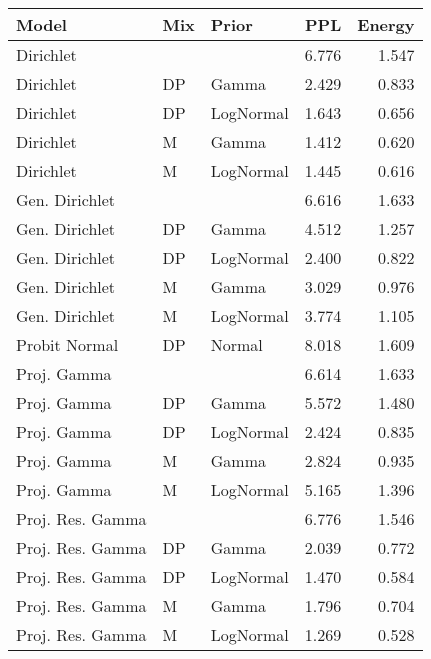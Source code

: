 \begin{table}[ht]
\centering
\begin{tabular}{lllrr}
  \hline
Model & Mix & Prior & PPL & Energy \\ 
  \hline
Dirichlet &  &  & 6.776 & 1.547 \\ 
  Dirichlet & DP & Gamma & 2.429 & 0.833 \\ 
  Dirichlet & DP & LogNormal & 1.643 & 0.656 \\ 
  Dirichlet & M & Gamma & 1.412 & 0.620 \\ 
  Dirichlet & M & LogNormal & 1.445 & 0.616 \\ 
  Gen. Dirichlet &  &  & 6.616 & 1.633 \\ 
  Gen. Dirichlet & DP & Gamma & 4.512 & 1.257 \\ 
  Gen. Dirichlet & DP & LogNormal & 2.400 & 0.822 \\ 
  Gen. Dirichlet & M & Gamma & 3.029 & 0.976 \\ 
  Gen. Dirichlet & M & LogNormal & 3.774 & 1.105 \\ 
  Probit Normal & DP & Normal & 8.018 & 1.609 \\ 
  Proj. Gamma &  &  & 6.614 & 1.633 \\ 
  Proj. Gamma & DP & Gamma & 5.572 & 1.480 \\ 
  Proj. Gamma & DP & LogNormal & 2.424 & 0.835 \\ 
  Proj. Gamma & M & Gamma & 2.824 & 0.935 \\ 
  Proj. Gamma & M & LogNormal & 5.165 & 1.396 \\ 
  Proj. Res. Gamma &  &  & 6.776 & 1.546 \\ 
  Proj. Res. Gamma & DP & Gamma & 2.039 & 0.772 \\ 
  Proj. Res. Gamma & DP & LogNormal & 1.470 & 0.584 \\ 
  Proj. Res. Gamma & M & Gamma & 1.796 & 0.704 \\ 
  Proj. Res. Gamma & M & LogNormal & 1.269 & 0.528 \\ 
   \hline
\end{tabular}
\label{tab:dev2}
\end{table}

